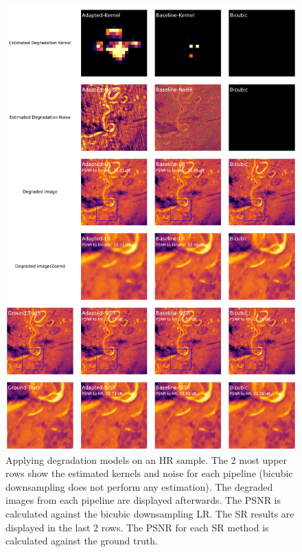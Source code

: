         \begin{figure}[H]
            \centering

            \includegraphics[scale=0.29]{Includes/5-source-prediction-sample.pdf}
            \caption{\small{\small{Applying degradation models on an HR sample. The 2 most upper rows show the estimated kernels and noise for each pipeline (bicubic downsampling does not perform any estimation). The degraded images from each pipeline are displayed afterwards. The PSNR is calculated against the bicubic downsampling LR. The SR results are displayed in the last 2 rows. The PSNR for each SR method is calculated against the ground truth.}}
            }
            \label{fig:5-source_domain_sample}
        \end{figure}



